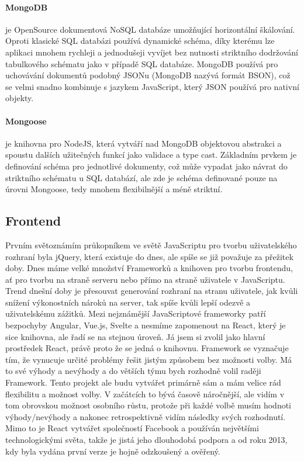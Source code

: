\documentclass[thesis=B,czech]{FITthesis}[2019/12/23]
\begin{document}
\paragraph{MongoDB} je OpenSource dokumentová NoSQL databáze umožňující horizontální škálování. Oproti klasické SQL databázi používá dynamické schéma, díky kterému lze aplikaci mnohem rychleji a jednodušeji vyvíjet bez nutnosti striktního dodržování tabulkového schématu jako v případě SQL databáze. MongoDB používá pro uchovávání dokumentů podobný JSONu (MongoDB nazývá formát BSON), což se velmi snadno kombinuje s jazykem JavaScript, který JSON používá pro nativní objekty.

\paragraph{Mongoose} je knihovna pro NodeJS, která vytváří nad MongoDB objektovou abstrakci a spoustu dalších užitečných funkcí jako validace a type cast. Základním prvkem je definování schéma pro jednotlivé dokumenty, což může vypadat jako návrat do striktního schématu u SQL databází, ale zde je schéma definované pouze na úrovni Mongoose, tedy mnohem flexibilnější a méně striktní.

\subsection{Frontend}
Prvním světoznámím průkopníkem ve světě JavaScriptu pro tvorbu uživatelského rozhraní byla jQuery, která existuje do dnes, ale spíše se již považuje za přežitek doby. Dnes máme velké množství Frameworků a knihoven pro tvorbu frontendu, ať pro tvorbu na straně serveru nebo přímo na straně uživatele v JavaScriptu. Trend dnešní doby je přesouvat generování rozhraní na stranu uživatele, jak kvůli snížení výkonostních nároků na server, tak spíše kvůli lepší odezvě a uživatelskému zážitků. Mezi nejznámější JavaScriptové frameworky patří bezpochyby Angular, Vue.js, Svelte a nesmíme zapomenout na React, který je sice knihovna, ale řadí se na stejnou úroveň. Já jsem si zvolil jako hlavní prostředek React, právě proto že se jedná o knihovnu. Framework se vyznačuje tím, že vynucuje určité problémy řešit jistým způsobem bez možnosti volby. Má to své výhody a nevýhody a do větších týmu bych rozhodně volil raději Framework. Tento projekt ale budu vytvářet primárně sám a mám velice rád flexibilitu a možnost volby. V začátcích to bývá časově náročnější, ale vidím v tom obrovskou možnost osobního růstu, protože při každé volbě musím hodnoti výhody/nevýhody a nakonec retrospektivně vidím následky svých rozhodnutí. Mimo to je React vytvářet společností Facebook a používán největšími technologickými světa, takže je jistá jeho dlouhodobá podpora a od roku 2013, kdy byla vydána první verze je hojně odzkoušený a ověřený.
\end{document}
